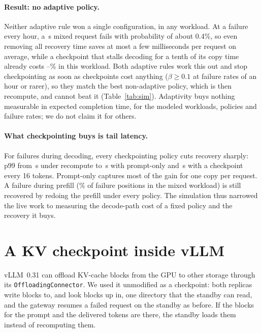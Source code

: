 \documentclass[10pt,twocolumn]{article}
\begin{document}
\paragraph{Result: no adaptive policy.} Neither adaptive rule won a single
configuration, in any workload. At a failure every hour, a
\SimMixedT\,s mixed request fails with probability of about 0.4\%, so even
removing all recovery time saves at most a few milliseconds per request on
average, while a checkpoint that stalls decoding for a tenth of its copy time
already costs \SimOvhMin--\SimOvhMax\% in this workload. Both adaptive rules work this out and stop
checkpointing as soon as checkpoints cost anything ($\beta\geq0.1$ at failure
rates of an hour or rarer), so they match the best non-adaptive policy, which
is then recompute, and cannot beat it (Table~\ref{tab:sim}). Adaptivity buys
nothing measurable in expected completion time, for the modeled workloads,
policies and failure rates; we do not claim it for others.

\paragraph{What checkpointing buys is tail latency.} For failures during
decoding, every checkpointing policy cuts recovery sharply: p99 from
\SimPninetynineRecompute\,s under recompute to \SimPninetyninePrompt\,s with prompt-only and
\SimPninetynineFixed\,s with a checkpoint every 16 tokens. Prompt-only captures most of the gain for one
copy per request. A failure during prefill (\SimPrefillShare\% of failure
positions in the mixed workload) is still recovered by redoing the prefill
under every policy. The simulation thus narrowed the live work to measuring
the decode-path cost of a fixed policy and the recovery it buys.

\section{A KV checkpoint inside vLLM}
\label{sec:live}

vLLM~0.31 can offload KV-cache blocks from the GPU to other storage through
its \texttt{OffloadingConnector}. We used it unmodified as a checkpoint: both
replicas write blocks to, and look blocks up in, one directory that the
standby can read, and the gateway resumes a failed request on the standby as
before. If the blocks for the prompt and the delivered tokens are there, the
standby loads them instead of recomputing them.
\end{document}
